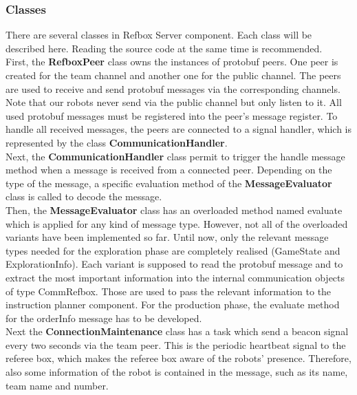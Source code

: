 \subsubsection{Classes}

There are several classes in Refbox Server component. Each class will be described here. Reading the source code at the same time is recommended.\\

First, the \textbf{RefboxPeer} class owns the instances of protobuf peers. One peer is created for the team channel and another one for the public channel. The peers are used to receive and send protobuf messages via the corresponding channels. Note that our robots never send via the public channel but only listen to it. All used protobuf messages must be registered into the peer’s message register. To handle all received messages, the peers are connected to a signal handler, which is represented by the class \textbf{CommunicationHandler}. \\

Next, the \textbf{CommunicationHandler} class permit to trigger the handle message method when a message is received from a connected peer. Depending on the type of the message, a specific evaluation method of the \textbf{MessageEvaluator} class is called to decode the message.\\

Then, the \textbf{MessageEvaluator} class has an overloaded method named evaluate which is applied for any kind of message type. However, not all of the overloaded variants have been implemented so far. Until now, only the relevant message types needed for the exploration phase are completely realised (GameState and ExplorationInfo). Each variant is supposed to read the protobuf message and to extract the most important information into the internal communication objects of type CommRefbox. Those are used to pass the relevant information to the instruction planner component. For the production phase, the evaluate method for the orderInfo message has to be developed.\\

Next the \textbf{ConnectionMaintenance} class has a task which send a beacon signal every two seconds via the team peer. This is the periodic heartbeat signal to the referee box, which makes the referee box aware of the robots’ presence. Therefore, also some information of the robot is contained in the message, such as its name, team name and number.\\

